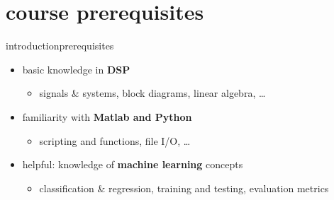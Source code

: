    \section[course prerequisites]{course prerequisites}
        \begin{frame}{introduction}{prerequisites}
            \begin{itemize}
                \item   basic knowledge in \textbf{DSP}
                    \begin{itemize}
                        \item signals \& systems, block diagrams, linear algebra, \ldots
                    \end{itemize}
                \bigskip
                \item	familiarity with \textbf{Matlab and Python} 
                    \begin{itemize}
                        \item   scripting and functions, file I/O, \ldots
                    \end{itemize}
                \bigskip
                \item	helpful: knowledge of \textbf{machine learning} concepts
                    \begin{itemize}
                        \item   classification \& regression, training and testing, evaluation metrics
                    \end{itemize}
            \end{itemize}
        \end{frame}


